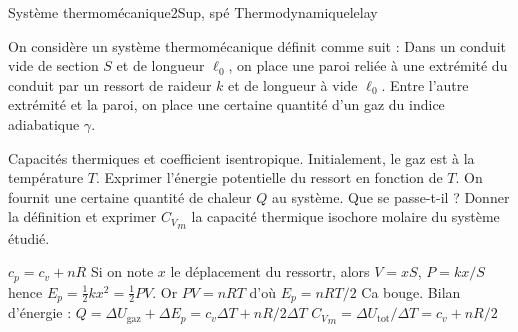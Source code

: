 \begin{exercise}{Système thermomécanique}{2}{Sup, spé}
{Thermodynamique}{lelay}

On considère un système thermomécanique définit comme suit : Dans un conduit vide de section $S$ et de longueur $\ell_0$, on place une paroi reliée à une extrémité du conduit par un ressort de raideur $k$ et de longueur à vide $\ell_0$. Entre l'autre extrémité et la paroi, on place une certaine quantité d'un gaz du indice adiabatique $\gamma$.

\begin{center}
\end{center}

\begin{questions}
    \questioncours Capacités thermiques et coefficient isentropique.
    \question Initialement, le gaz est à la température $T$. Exprimer l'énergie potentielle du ressort en fonction de $T$.
    \question On fournit une certaine quantité de chaleur $Q$ au système. Que se passe-t-il ? 
    \question Donner la définition et exprimer ${C_{V}}_{m}$ la capacité thermique isochore molaire du système étudié.
\end{questions}

\end{exercise}

\begin{solution}

\begin{questions}
    \questioncours $c_p = c_v + nR$
    \question Si on note $x$ le déplacement du ressortr, alors $V = x S$, $P = kx/S$ hence $E_p = \frac12 kx^2 =\frac12 PV$. Or $PV =nRT$ d'où $E_p = nRT/2$
    \question Ca bouge. Bilan d'énergie : $Q = \Delta U_\text{gaz} + \Delta E_p = c_v \Delta T + nR/2\Delta T$
    \question  ${C_{V}}_{m} = \Delta U_\text{tot}/\Delta T = c_v + nR/2$
\end{questions}

\end{solution}